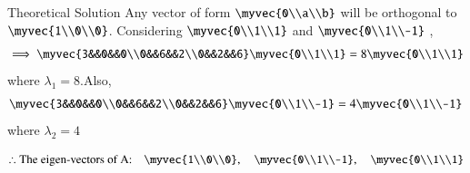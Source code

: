 \documentclass{beamer}
\begin{document}
\begin{frame}{Theoretical Solution}
Any vector of form $\myvec{0\\a\\b}$ will be orthogonal to $\myvec{1\\0\\0}$. Considering $\myvec{0\\1\\1}$ and $\myvec{0\\1\\-1}$ , 
\begin{align}
    \implies \myvec{3&&0&&0\\0&&6&&2\\0&&2&&6}\myvec{0\\1\\1}=8\myvec{0\\1\\1}
\end{align}
where $\lambda_1=8$.Also,
\begin{align}
    \myvec{3&&0&&0\\0&&6&&2\\0&&2&&6}\myvec{0\\1\\-1}=4\myvec{0\\1\\-1}
\end{align}
where $\lambda_2=4$

\begin{align}
    \therefore \text{The eigen-vectors of A:}\quad \myvec{1\\0\\0},\quad \myvec{0\\1\\-1},\quad \myvec{0\\1\\1}
\end{align}
\end{frame}
\end{document}
